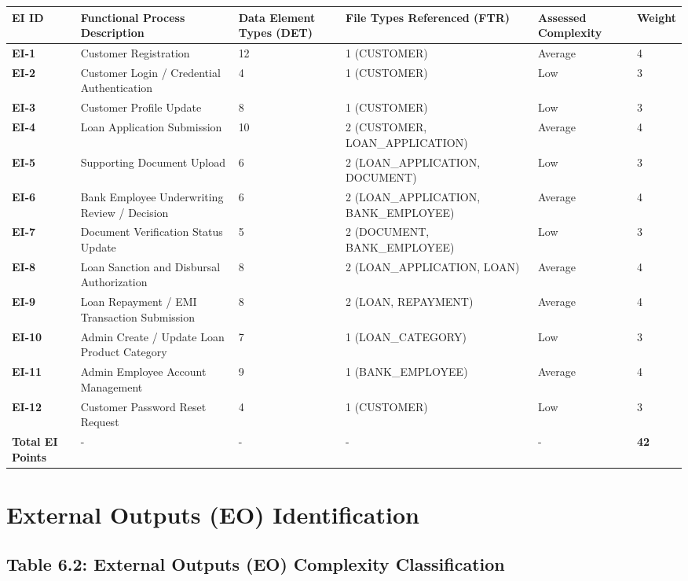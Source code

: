 \documentclass[12pt,a4paper,oneside]{report}
\begin{document}
\begin{table}[htbp]
\centering
\small
\begin{tabularx}{\textwidth}{p{2.5cm} X X X X X}
\toprule
\textbf{EI ID} & \textbf{Functional Process Description} & \textbf{Data Element Types (DET)} & \textbf{File Types Referenced (FTR)} & \textbf{Assessed Complexity} & \textbf{Weight} \\
\midrule
\textbf{EI-1} & Customer Registration & 12 & 1 (CUSTOMER) & Average & 4 \\
\textbf{EI-2} & Customer Login / Credential Authentication & 4 & 1 (CUSTOMER) & Low & 3 \\
\textbf{EI-3} & Customer Profile Update & 8 & 1 (CUSTOMER) & Low & 3 \\
\textbf{EI-4} & Loan Application Submission & 10 & 2 (CUSTOMER, LOAN\_APPLICATION) & Average & 4 \\
\textbf{EI-5} & Supporting Document Upload & 6 & 2 (LOAN\_APPLICATION, DOCUMENT) & Low & 3 \\
\textbf{EI-6} & Bank Employee Underwriting Review / Decision & 6 & 2 (LOAN\_APPLICATION, BANK\_EMPLOYEE) & Average & 4 \\
\textbf{EI-7} & Document Verification Status Update & 5 & 2 (DOCUMENT, BANK\_EMPLOYEE) & Low & 3 \\
\textbf{EI-8} & Loan Sanction and Disbursal Authorization & 8 & 2 (LOAN\_APPLICATION, LOAN) & Average & 4 \\
\textbf{EI-9} & Loan Repayment / EMI Transaction Submission & 8 & 2 (LOAN, REPAYMENT) & Average & 4 \\
\textbf{EI-10} & Admin Create / Update Loan Product Category & 7 & 1 (LOAN\_CATEGORY) & Low & 3 \\
\textbf{EI-11} & Admin Employee Account Management & 9 & 1 (BANK\_EMPLOYEE) & Average & 4 \\
\textbf{EI-12} & Customer Password Reset Request & 4 & 1 (CUSTOMER) & Low & 3 \\
\textbf{Total EI Points} & - & - & - & - & \textbf{42} \\
\bottomrule
\end{tabularx}
\end{table}

\section{External Outputs (EO) Identification}

\subsection{Table 6.2: External Outputs (EO) Complexity Classification}
\end{document}
